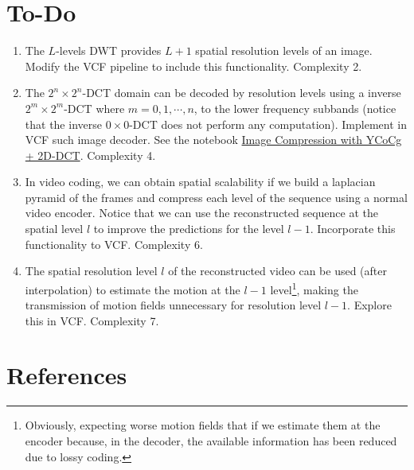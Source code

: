\section{To-Do}
\begin{enumerate}
\item The $L$-levels DWT provides $L+1$ spatial resolution levels of
  an image. Modify the VCF pipeline to include this
  functionality. Complexity 2.
\item The $2^n\times 2^n$-DCT domain can be decoded by resolution
  levels using a inverse $2^m\times 2^m$-DCT where $m=0,1,\cdots,n$,
  to the lower frequency subbands (notice that the inverse $0\times
  0$-DCT does not perform any computation). Implement in VCF such
  image decoder. See the notebook
  \href{https://github.com/vicente-gonzalez-ruiz/DCT2D/blob/master/docs/YCoCg_2D_DCT_SQ.ipynb}{Image
    Compression with YCoCg + 2D-DCT}. Complexity 4.
\item In video coding, we can obtain spatial scalability if we build a
  laplacian pyramid of the frames and compress each level of the
  sequence using a normal video encoder. Notice that we can use the
  reconstructed sequence at the spatial level $l$ to improve the
  predictions for the level $l-1$. Incorporate this functionality to
  VCF. Complexity 6.
\item The spatial resolution level $l$ of the reconstructed video can
  be used (after interpolation) to estimate the motion at the $l-1$
  level\footnote{Obviously, expecting worse motion fields that if we
    estimate them at the encoder because, in the decoder, the
    available information has been reduced due to lossy coding.},
  making the transmission of motion fields unnecessary for resolution
  level $l-1$. Explore this in VCF. Complexity 7.
\end{enumerate}

\section{References}

\renewcommand{\addcontentsline}[3]{}%

